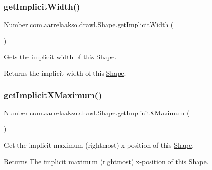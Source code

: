 \subsubsection{\texorpdfstring{get\+Implicit\+Width()}{getImplicitWidth()}}
{\footnotesize\ttfamily \hyperlink{interfacecom_1_1aarrelaakso_1_1drawl_1_1_number}{Number} com.\+aarrelaakso.\+drawl.\+Shape.\+get\+Implicit\+Width (\begin{DoxyParamCaption}{ }\end{DoxyParamCaption})\hspace{0.3cm}{\ttfamily [protected]}}



Gets the implicit width of this \hyperlink{classcom_1_1aarrelaakso_1_1drawl_1_1_shape}{Shape}. 

\begin{DoxyReturn}{Returns}
the implicit width of this \hyperlink{classcom_1_1aarrelaakso_1_1drawl_1_1_shape}{Shape}. 
\end{DoxyReturn}
\mbox{\label{classcom_1_1aarrelaakso_1_1drawl_1_1_shape_a0903079fd35e3cfdd6cdc299548a9680}} 
\subsubsection{\texorpdfstring{get\+Implicit\+X\+Maximum()}{getImplicitXMaximum()}}
{\footnotesize\ttfamily \hyperlink{interfacecom_1_1aarrelaakso_1_1drawl_1_1_number}{Number} com.\+aarrelaakso.\+drawl.\+Shape.\+get\+Implicit\+X\+Maximum (\begin{DoxyParamCaption}{ }\end{DoxyParamCaption})\hspace{0.3cm}{\ttfamily [protected]}}



Get the implicit maximum (rightmost) x-\/position of this \hyperlink{classcom_1_1aarrelaakso_1_1drawl_1_1_shape}{Shape}. 

\begin{DoxyReturn}{Returns}
The implicit maximum (rightmost) x-\/position of this \hyperlink{classcom_1_1aarrelaakso_1_1drawl_1_1_shape}{Shape}. 
\end{DoxyReturn}
\mbox{\label{classcom_1_1aarrelaakso_1_1drawl_1_1_shape_a264da8a94218b09267c2e177ff0b0951}} 
